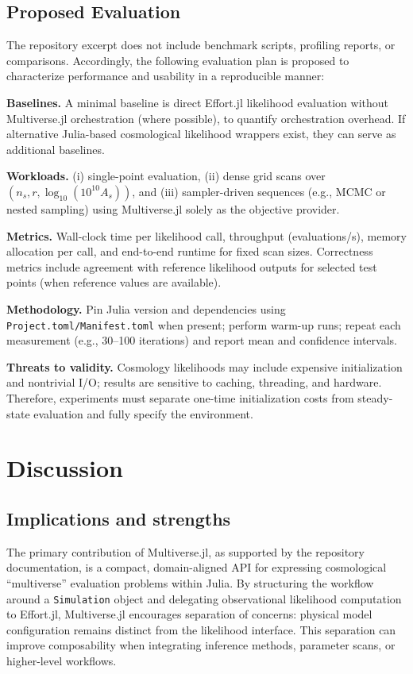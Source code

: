 \documentclass[11pt]{article}
\begin{document}
\subsection{Proposed Evaluation}
The repository excerpt does not include benchmark scripts, profiling reports, or comparisons.
Accordingly, the following evaluation plan is proposed to characterize performance and usability in a reproducible manner:

\textbf{Baselines.} A minimal baseline is direct Effort.jl likelihood evaluation without Multiverse.jl orchestration (where possible), to quantify orchestration overhead.
If alternative Julia-based cosmological likelihood wrappers exist, they can serve as additional baselines.

\textbf{Workloads.} (i) single-point evaluation, (ii) dense grid scans over \((n_s, r, \log_{10}(10^{10}A_s))\), and (iii) sampler-driven sequences (e.g., MCMC or nested sampling) using Multiverse.jl solely as the objective provider.

\textbf{Metrics.} Wall-clock time per likelihood call, throughput (evaluations/s), memory allocation per call, and end-to-end runtime for fixed scan sizes.
Correctness metrics include agreement with reference likelihood outputs for selected test points (when reference values are available).

\textbf{Methodology.} Pin Julia version and dependencies using \texttt{Project.toml/Manifest.toml} when present; perform warm-up runs; repeat each measurement (e.g., 30--100 iterations) and report mean and confidence intervals.

\textbf{Threats to validity.} Cosmology likelihoods may include expensive initialization and nontrivial I/O; results are sensitive to caching, threading, and hardware.
Therefore, experiments must separate one-time initialization costs from steady-state evaluation and fully specify the environment.

\section{Discussion}
\subsection{Implications and strengths}
The primary contribution of Multiverse.jl, as supported by the repository documentation, is a compact, domain-aligned API for expressing cosmological ``multiverse'' evaluation problems within Julia.
By structuring the workflow around a \texttt{Simulation} object and delegating observational likelihood computation to Effort.jl, Multiverse.jl encourages separation of concerns: physical model configuration remains distinct from the likelihood interface.
This separation can improve composability when integrating inference methods, parameter scans, or higher-level workflows.
\end{document}
